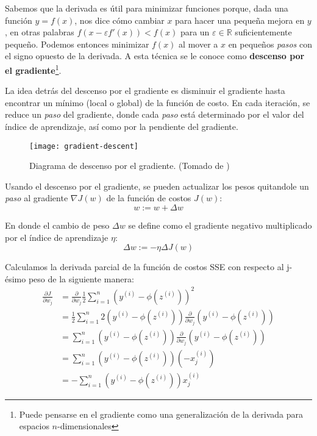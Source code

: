 Sabemos que la derivada es útil para minimizar funciones porque, dada
una función $y = f(x)$, nos dice cómo cambiar $x$ para hacer una
pequeña mejora en $y$, en otras palabras $f(x-\varepsilon f'(x)) <
f(x)$ para un $\varepsilon \in \mathbb{R}$ suficientemente
pequeño. Podemos entonces minimizar $f(x)$ al mover a $x$ en pequeños
\textit{pasos} con el signo opuesto de la derivada. A esta técnica se
le conoce como \textbf{descenso por el gradiente}\footnote{Puede
pensarse en el gradiente como una generalización de la derivada para
espacios $n$-dimensionales}.

La idea detrás del descenso por el gradiente es disminuir el gradiente hasta encontrar
un mínimo (local o global) de la función de costo. En cada iteración, se reduce
un \textit{paso} del gradiente, donde cada \textit{paso} está determinado por
el valor del índice de aprendizaje, así como por la pendiente del gradiente.

\begin{figure}[H]
\begin{center}
  \texttt{[image: gradient-descent]}
  \caption{Diagrama de descenso por el gradiente. (Tomado de \cite{python})}
\end{center}
\end{figure}

Usando el descenso por el gradiente, se pueden actualizar los pesos quitandole un \textit{paso}
al gradiente $\nabla J(w)$ de la función de costos $J(w)$:
\begin{equation}
  w:=w + \Delta w
\end{equation}

En donde el cambio de peso $\Delta w$ se define como el gradiente negativo multiplicado
por el índice de aprendizaje $\eta$:
\begin{equation}
  \Delta w:=-\eta \Delta J(w)
\end{equation}

Calculamos la derivada parcial de la función de costos SSE con respecto al
j-ésimo peso de la siguiente manera:
\begin{equation*}
\begin{split}
  \frac{\partial J}{\partial w_j} &= \frac{\partial}{\partial w_j}\frac{1}{2}\sum_{i=1}^n (y^{(i)} - \phi(z^{(i)}))^2 \\
  &= \frac{1}{2}\sum_{i=1}^n 2(y^{(i)} - \phi(z^{(i)}))\frac{\partial}{\partial w_j}(y^{(i)} - \phi(z^{(i)}))\\
  &= \sum_{i=1}^n (y^{(i)} - \phi(z^{(i)}))\frac{\partial}{\partial w_j}(y^{(i)} - \phi (z^{(i)}))\\
  &= \sum_{i=1}^n(y^{(i)} - \phi(z^{(i)}))(-x_j^{(i)})\\
  &= -\sum_{i=1}^n(y^{(i)} - \phi(z^{(i)}))x_j^{(i)}
\end{split}
\end{equation*}


